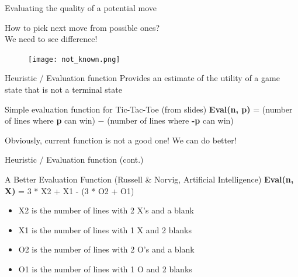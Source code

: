 \documentclass{beamer}
\begin{document}
\begin{frame}{Evaluating the quality of a potential move}

How to pick next move from possible ones? \\
We need to see difference! 
\begin{figure}
	\texttt{[image: not\_known.png]}	
\end{figure}
\end{frame}

\begin{frame}{Heuristic / Evaluation function}
Provides an estimate of the utility of a game state that is
not a terminal state
\begin{block}{Simple evaluation function for Tic-Tac-Toe (from slides)}
\textbf{Eval(n, p)} = (number of lines where \textbf{p} can win) $-$ (number of lines where \textbf{-p} can win)
\end{block}

\pause
 Obviously, current function is not a good one! We can do better!
\end{frame}



\begin{frame}{Heuristic / Evaluation function (cont.)}

\begin{block}{A Better Evaluation Function   (Russell \& Norvig, Artificial Intelligence)}
\textbf{Eval(n, X)} = 3 * X2 + X1 - (3 * O2 + O1) \\

\begin{itemize}
 \item X2 is the number of lines with 2 X's and a blank
 \item X1 is the number of lines with 1 X and 2 blanks
 \item O2 is the number of lines with 2 O's and a blank
 \item O1 is the number of lines with 1 O and 2 blanks 
\end{itemize}

\end{block}

\end{frame}
\end{document}
